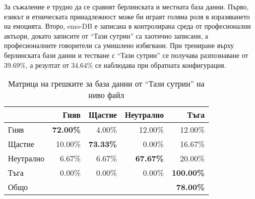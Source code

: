 \documentclass[main.tex]{subfiles}
\begin{document}
За съжаление е трудно да се сравнят берлинската и местната база данни. Първо, езикът и етническата принадлежност може би играят голяма роля в изразяването на емоцията. Второ, emo-DB е записана в контролирана среда от професионални актьори, докато записите от ``Тази сутрин'' са хаотично записани, а професионалните говорители са умишлено избягвани. При трениране върху берлинската бази данни и тестване с ``Тази сутрин'' се получава разпознаване от $39.69\%$, а резултат от $34.64\%$ се наблюдава при обратната конфигурация.
\begin{table}[h]
    \begin{center}
    \begin{tabular}{|l|r r r r|} 
        \hline
        & Гняв & Щастие & Неутрално & Тъга\\ 
        \hline
        Гняв &  \textbf{72.00\%} & 4.00\% & 12.00\% & 12.00\%\\ 
        Щастие & 10.00\% & \textbf{73.33\%} & 0.00\% & 16.67\% \\ 
        Неутрално & 6.67\% & 6.67\% & \textbf{67.67\%} & 20.00\% \\ 
        Тъга & 0.00\% & 0.00\% & 0.00\% & \textbf{100.00\%}\\ 
        \hline
        \hline
        Общо & & & & \textbf{78.00\%}\\
        \hline
    \end{tabular}
    \caption{Матрица на грешките за база данни от ``Тази сутрин'' на ниво файл}
    \label{tab:speech:results:05}
    \end{center}
\end{table}
\end{document}

